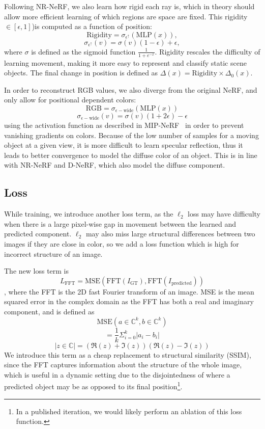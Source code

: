 Following NR-NeRF, we also learn how rigid each ray is, which in theory should allow more efficient learning of which regions are space are fixed. This rigidity $\in[\epsilon, 1]$)is computed as a function of position:
\[ \text{Rigidity} =\sigma_{\epsilon^\uparrow}(\text{MLP}(x)), \]
\[ \sigma_{\epsilon^\uparrow}(v) = \sigma(v)(1-\epsilon) + \epsilon, \]
where $\sigma$ is defined as the sigmoid function $\frac{1}{1+e^{-x}}$. Rigidity rescales the
difficulty of learning movement, making it more easy to represent and classify static scene
objects. The final change in position is defined as $\Delta(x) = \text{Rigidity}\times
\Delta_0(x)$.

In order to reconstruct RGB values, we also diverge from the original NeRF, and only allow for
positional dependent colors:
\[ \text{RGB} = \sigma_{\epsilon-\text{wide}}(\text{MLP}(x)) \]
\[ \sigma_{\epsilon-\text{wide}}(v) = \sigma(v)(1+2\epsilon) - \epsilon \]
using the activation function as described in MIP-NeRF~\cite{barron2021mipnerf} in order to prevent vanishing gradients on colors. Because of the low number of
samples for a moving object at a given view, it is more difficult to learn specular
reflection, thus it leads to better convergence to model the diffuse color of an object. This is in line with NR-NeRF and D-NeRF, which also model the diffuse component.

\iffalse
\subsection*{Loss}

While training, we introduce another loss term, as the $\ell_2$ loss may have
difficulty when there is a large pixel-wise gap in movement between the learned and predicted
component. $\ell_2$ may also miss large structural differences between two images if they are close in color, so we add a loss function which is high for incorrect structure of an image.

The new loss term is \[
    L_\text{FFT} = \text{MSE}(\text{FFT}(I_\text{GT}), \text{FFT}(I_\text{predicted}))
\],
where the FFT is the 2D fast Fourier transform of an image.
MSE is the mean squared error in the complex domain as the FFT has both a real and imaginary component, and is defined as \[ \text{MSE}(a\in\mathbb{C}^k,b\in\mathbb{C}^k) \]
\[ = \frac{1}{k}\Sigma_{i=0}^k|a_i-b_i| \]
\[ |z\in\mathbb{C}| = (\Re(z)+\Im(z))(\Re(z)-\Im(z)) \]
We introduce this term as a cheap replacement to structural similarity (SSIM), since the
FFT captures information about the structure of the whole image, which is useful in a dynamic setting due to the disjointedness of where a predicted object may be as opposed to its final position\footnote{In a published iteration, we would likely perform an ablation of this loss function.}.

